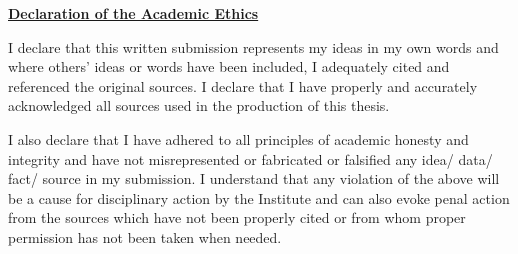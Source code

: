 \begin{titlepage}
\onehalfspacing
\begin{center}
	
\vspace{1cm}
\textbf{\large{\underline{Declaration of the Academic Ethics}}}\\
\vspace{0.5cm}
\end{center}
\doublespacing
I declare that this written submission represents my ideas in my own words and where
others' ideas or words have been included, I adequately cited and referenced the
original sources. I declare that I have properly and accurately acknowledged all sources
used in the production of this thesis.

I also declare that I have adhered to all principles of academic honesty and integrity and have not misrepresented or fabricated or falsified any idea/ data/ fact/ source in my submission. I understand that any violation of the above will be a cause for disciplinary action by the Institute and can also evoke penal action from the sources which have not been properly cited or from whom proper permission has not been taken when needed.\\

\vskip 4cm

\begin{center}
\onehalfspacing
{\hfill {}}
\end{center}
\end{titlepage}


